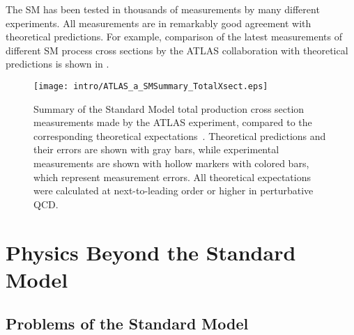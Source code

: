The SM has been tested in thousands of measurements by many different experiments.
All measurements are in remarkably good agreement with theoretical predictions.
For example, comparison of the latest measurements of different SM process cross sections by the ATLAS collaboration with theoretical predictions is shown in
.

\begin{figure}[]
  \centering
  \texttt{[image: intro/ATLAS\_a\_SMSummary\_TotalXsect.eps]}
  \caption{
  Summary of the Standard Model total production cross section measurements made by the ATLAS experiment, compared to the corresponding theoretical expectations~\cite{sm_atlas_public_plots_2016}. 
  Theoretical predictions and their errors are shown with gray bars, while experimental
  measurements are shown with hollow markers with colored bars, which represent measurement errors.
  All theoretical expectations were calculated at next-to-leading order or higher in perturbative QCD.
  }
  \label{fig:SM_theory_vs_data}
\end{figure}








\section{Physics Beyond the Standard Model}

\subsection{Problems of the Standard Model}

